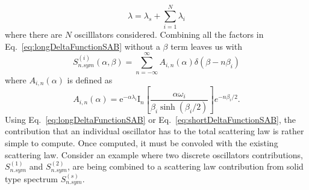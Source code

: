 \documentclass[../master.tex]{subfiles}
\begin{document}
                                \begin{equation}
                                        \lambda=\lambda_{s}+\sum_{i=1}^{N}\lambda_{i}
                                \end{equation}
                                where there are $N$ oscilllators considered. Combining all the factors in Eq.~\ref{eq:longDeltaFunctionSAB} without a $\beta$ term leaves us with
				\begin{equation}
                                  S^{(i)}_{n.sym}(\alpha,\beta)=\sum_{n=-\infty}^{\infty}A_{i,n}(\alpha)\delta\left(\beta-n\beta_{i}\right)\label{eq:shortDeltaFunctionSAB}
				\end{equation}
                                where $A_{i,n}(\alpha)$ is defined as 
                                \begin{equation}
                                  A_{i,n}(\alpha)=\mathrm{e}^{-\alpha\lambda_i}\mathrm{I}_n\left[\frac{\alpha\omega_i}{\beta_i\sinh(\beta_i/2)}\right]e^{-n\beta_i/2}.
                                \end{equation}
                                Using Eq.~\ref{eq:longDeltaFunctionSAB} or Eq.~\ref{eq:shortDeltaFunctionSAB}, the contribution that an individual oscillator has to the total scattering law is rather simple to compute. Once computed, it must be convoled with the existing scattering law. Consider an example where two discrete oscillators contributions, $S^{(1)}_{n.sym}$ and $S^{(2)}_{n.sym}$, are being combined to a scattering law contribution from solid type spectrum $S^{(s)}_{n.sym}$.
\end{document}
